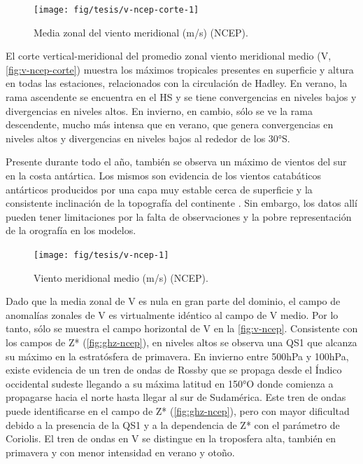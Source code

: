\documentclass[spanish,a4paper,12pt,oneside]{book}
\begin{document}
\begin{figure}
\texttt{[image: fig/tesis/v-ncep-corte-1]} \caption{Media zonal del viento meridional (m/s) (NCEP).}\label{fig:v-ncep-corte}
\end{figure}

El corte vertical-meridional del promedio zonal viento meridional medio
(V, \autoref{fig:v-ncep-corte}) muestra los máximos tropicales presentes
en superficie y altura en todas las estaciones, relacionados con la
circulación de Hadley. En verano, la rama ascendente se encuentra en el
HS y se tiene convergencias en niveles bajos y divergencias en niveles
altos. En invierno, en cambio, sólo se ve la rama descendente, mucho más
intensa que en verano, que genera convergencias en niveles altos y
divergencias en niveles bajos al rededor de los 30°S.

Presente durante todo el año, también se observa un máximo de vientos
del sur en la costa antártica. Los mismos son evidencia de los vientos
catabáticos antárticos producidos por una capa muy estable cerca de
superficie y la consistente inclinación de la topografía del continente
\citep{King1997}. Sin embargo, los datos allí pueden tener limitaciones
por la falta de observaciones y la pobre representación de la orografía
en los modelos.

\begin{landscape}\begin{figure}

{\centering \texttt{[image: fig/tesis/v-ncep-1]} 

}

\caption{Viento meridional medio (m/s) (NCEP).}\label{fig:v-ncep}
\end{figure}
\end{landscape}

Dado que la media zonal de V es nula en gran parte del dominio, el campo
de anomalías zonales de V es virtualmente idéntico al campo de V medio.
Por lo tanto, sólo se muestra el campo horizontal de V en la
\autoref{fig:v-ncep}. Consistente con los campos de Z*
(\autoref{fig:ghz-ncep}), en niveles altos se observa una QS1 que
alcanza su máximo en la estratósfera de primavera. En invierno entre
500hPa y 100hPa, existe evidencia de un tren de ondas de Rossby que se
propaga desde el Índico occidental sudeste llegando a su máxima latitud
en 150°O donde comienza a propagarse hacia el norte hasta llegar al sur
de Sudamérica. Este tren de ondas puede identificarse en el campo de Z*
(\autoref{fig:ghz-ncep}), pero con mayor dificultad debido a la
presencia de la QS1 y a la dependencia de Z* con el parámetro de
Coriolis. El tren de ondas en V se distingue en la troposfera alta,
también en primavera y con menor intensidad en verano y otoño.
\end{document}
